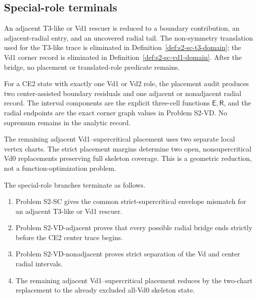 \subsection{Special-role terminals}

\begin{definition}
\label{def:body-adjacent-rescuer-data}
An adjacent T3-like or Vd1 rescuer is reduced to a boundary contribution, an
adjacent-radial entry, and an uncovered radial tail.  The non-symmetry
translation used for the T3-like trace is eliminated in
Definition~\ref{def:s2-sc-t3-domain}; the Vd1 corner record is eliminated in
Definition~\ref{def:s2-sc-vd1-domain}.  After the bridge, no placement or
translated-role predicate remains.
\end{definition}

\begin{definition}
\label{def:body-vd-residual-data}
For a CE2 state with exactly one Vd1 or Vd2 role, the placement audit produces
two center-assisted boundary residuals and one adjacent or nonadjacent radial
record.  The interval components are the explicit three-cell functions
\(\mathsf E,\mathsf R\), and the radial endpoints are the exact corner graph
values in Problem S2-VD.  No supremum remains in the analytic record.
\end{definition}

\begin{definition}
\label{def:body-vd-replacement-data}
The remaining adjacent Vd1--supercritical placement uses two separate local
vertex charts.  The strict placement margins determine two open,
nonsupercritical Vd0 replacements preserving full skeleton coverage.  This is
a geometric reduction, not a function-optimization problem.
\end{definition}

\begin{proposition}
\label{prop:body-special-terminal-certificates}
The special-role branches terminate as follows.
\begin{enumerate}
\item Problem S2-SC gives the common strict-supercritical envelope mismatch
for an adjacent T3-like or Vd1 rescuer.
\item Problem S2-VD-adjacent proves that every possible radial bridge ends
strictly before the CE2 center trace begins.
\item Problem S2-VD-nonadjacent proves strict separation of the Vd and center
radial intervals.
\item The remaining adjacent Vd1--supercritical placement reduces by the
two-chart replacement to the already excluded all-Vd0 skeleton state.
\end{enumerate}
\end{proposition}

